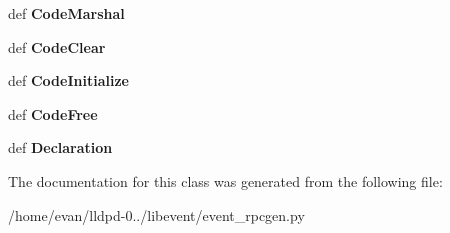 \begin{DoxyCompactItemize}
\item 
def {\bfseries \-Code\-Marshal}\label{classevent__rpcgen_1_1_entry_struct_ae994601ffc7e740cede6cb32d6d4f55a}

\item 
def {\bfseries \-Code\-Clear}\label{classevent__rpcgen_1_1_entry_struct_a7b18b6858614ca342000830c02218696}

\item 
def {\bfseries \-Code\-Initialize}\label{classevent__rpcgen_1_1_entry_struct_a24ae658809888439abef27b3633d22a0}

\item 
def {\bfseries \-Code\-Free}\label{classevent__rpcgen_1_1_entry_struct_a81ad9b6c3af1d0fe115d2b2e54ee8a17}

\item 
def {\bfseries \-Declaration}\label{classevent__rpcgen_1_1_entry_struct_a564a165c99a4874ce9135fc27e62cebc}

\end{DoxyCompactItemize}


\-The documentation for this class was generated from the following file\-:\begin{DoxyCompactItemize}
\item 
/home/evan/lldpd-\/0../libevent/event\-\_\-rpcgen.\-py\end{DoxyCompactItemize}

